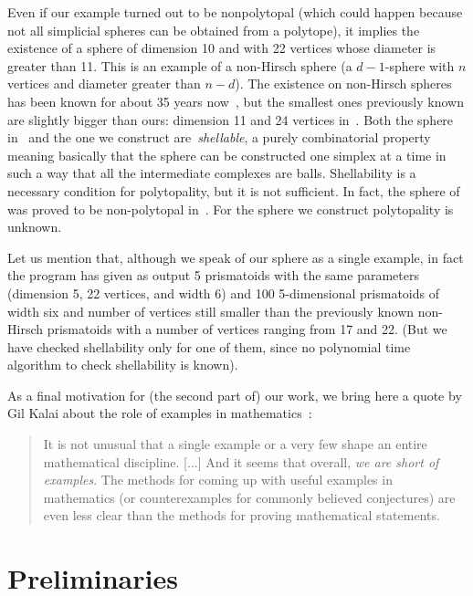 \documentclass[12pt,a4paper]{article}
\theoremstyle{plain}
\theoremstyle{definition}
\begin{document}
Even if our example turned out to be nonpolytopal (which could happen because not all simplicial spheres can be obtained from a polytope), it implies the existence of a sphere of dimension 10 and with 22 vertices whose diameter is greater than 11. This is an example of a non-Hirsch sphere (a $d-1$-sphere with $n$ vertices and diameter greater than $n-d$).
The existence on non-Hirsch spheres has been known for about 35 years now~\cite{ManiWalkup}, but the smallest ones previously known are slightly bigger than ours: dimension 11 and 24 vertices in~\cite{ManiWalkup}. Both the sphere in~\cite{ManiWalkup} and the one we construct are~\emph{shellable}, a purely combinatorial property meaning basically that the sphere can be constructed one simplex at a time in such a way that all the intermediate complexes are balls. Shellability is a necessary condition for polytopality, but it is not sufficient. In fact, the sphere of~\cite{ManiWalkup} was proved to be non-polytopal in~\cite{nonPolytopal}. For the sphere we construct polytopality is unknown.

Let us mention that, although we speak of our sphere as a single example, in fact the program has given as output 5 prismatoids with the same parameters (dimension 5, 22 vertices, and width 6) and 100  5-dimensional prismatoids of width six and  number of vertices still smaller than the previously known non-Hirsch prismatoids with a number of vertices ranging from 17 and 22. (But we have checked shellability only for one of them, since no polynomial time algorithm to check shellability is known).

As a final motivation for (the second part of) our work, we bring here a quote by Gil Kalai about the role of examples in mathematics~\cite[p.~769]{examples}:

\begin{quote}
It is not unusual that a single example or a very few shape an entire mathematical discipline. [...] And it seems that overall, \emph{we are short of examples}. The methods for coming up with useful examples in mathematics (or counterexamples for commonly believed conjectures) are even less clear than the methods for proving mathematical statements.
\end{quote}

\section{Preliminaries}
\end{document}
